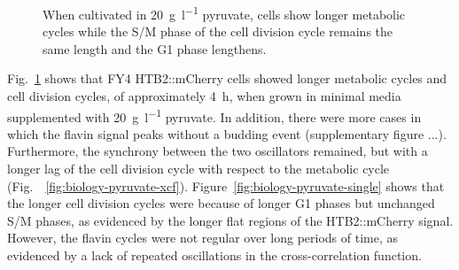 \begin{figure}
  \caption{
    When cultivated in \SI{20}{\gram~\litre^{-1}} pyruvate, cells show longer metabolic cycles while the S/M phase of the cell division cycle remains the same length and the G1 phase lengthens.
  }
  \label{fig:biology-pyruvate}
\end{figure}

Fig.\ \ref{fig:biology-pyruvate} shows that FY4 HTB2::mCherry cells showed longer metabolic cycles and cell division cycles, of approximately \SI{4}{\hour}, when grown in minimal media supplemented with \SI{20}{\gram~\litre^{-1}} pyruvate.
In addition, there were more cases in which the flavin signal peaks without a budding event (supplementary figure ...).
Furthermore, the synchrony between the two oscillators remained, but with a longer lag of the cell division cycle with respect to the metabolic cycle (Fig.\ ~\ref{fig:biology-pyruvate-xcf}).
Figure~\ref{fig:biology-pyruvate-single} shows that the longer cell division cycles were because of longer G1 phases but unchanged S/M phases, as evidenced by the longer flat regions of the HTB2::mCherry signal.
However, the flavin cycles were not regular over long periods of time, as evidenced by a lack of repeated oscillations in the cross-correlation function.



